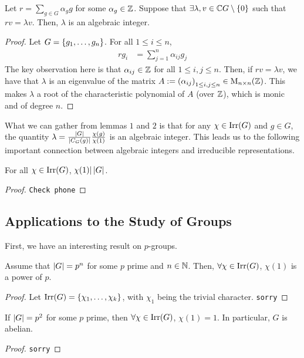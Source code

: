 \begin{lemma}
    Let $r = \sum_{g \in G} \alpha_g g$ for some $\alpha_g \in \mathbb{Z}$. Suppose that $\exists \lambda, v \in \mathbb{C} G \setminus \left\{ 0 \right\}$ such that $rv = \lambda v$. Then, $\lambda$ is an algebraic integer.
\end{lemma}
\begin{proof}
    Let $G = \left\{ g_1, \ldots, g_n \right\}$. For all $1 \leq i \leq n$,
    \begin{align*}
        r g_i &= \sum_{j=1}^{n} \alpha_{ij} g_j
    \end{align*}
    The key observation here is that $\alpha_{ij} \in \mathbb{Z}$ for all $1 \leq i,j \leq n$. %
    Then, if $rv = \lambda v$, we have that $\lambda$ is an eigenvalue of the matrix $A := \left( \alpha_{ij} \right)_{1 \leq i,j \leq n} \in \mathrm{M}_{{n} \times {n}}\!\left( {\mathbb{Z}} \right)$. This makes $\lambda$ a root of the characteristic polynomial of $A$ (over $\mathbb{Z}$), which is monic and of degree $n$.
\end{proof}

What we can gather from lemmas $1$ and $2$ is that for any $\chi \in \operatorname{Irr}\!\left( G \right)$ and $g \in G$, the quantity $\lambda = \frac{\left\lvert G \right\rvert}{\left\lvert C_G(g) \right\rvert} \frac{\chi(g)}{\chi(1)}$ is an algebraic integer. This leads us to the following important connection between algebraic integers and irreducible representations.

\begin{theorem} \label{Ch2:Thm:Char_div_Ord_Grp}
    For all $\chi \in \operatorname{Irr}\!\left( G \right)$, $\chi(1) \vert \left\lvert G \right\rvert$.
\end{theorem}
\begin{proof}
    \verb|Check phone|
\end{proof}

\subsection{Applications to the Study of Groups}

First, we have an interesting result on $p$-groups.

\begin{lemma} Assume that $\left\lvert G \right\rvert = p^n$ for some $p$ prime and $n \in \mathbb{N}$. Then, $\forall \chi \in \operatorname{Irr}\!\left( G \right)$, $\chi(1)$ is a power of $p$.
\end{lemma}
\begin{proof}
    Let $\operatorname{Irr}\!\left( G \right) = \left\{ \chi_1, \ldots, \chi_k \right\}$, with $\chi_1$ being the trivial character.
    \verb|sorry|
\end{proof}
\begin{corollary}
    If $\left\lvert G \right\rvert = p^2$ for some $p$ prime, then $\forall \chi \in \operatorname{Irr}\!\left( G \right)$, $\chi(1) = 1$. In particular, $G$ is abelian.
\end{corollary}
\begin{proof}
    \verb|sorry|
\end{proof}

